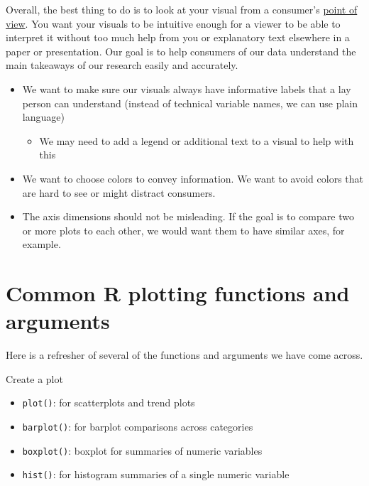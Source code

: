 \documentclass[
  letterpaper,
  DIV=11,
  numbers=noendperiod]{scrreprt}
\providecommand{\tightlist}{%
  \setlength{\itemsep}{0pt}\setlength{\parskip}{0pt}}\usepackage{longtable,booktabs,array}
\begin{document}
Overall, the best thing to do is to look at your visual from a
consumer's
\href{https://www.youtube.com/watch?v=nQJEp-k-ogs\&ab_channel=ArianaGrandeVevo}{point
of view}. You want your visuals to be intuitive enough for a viewer to
be able to interpret it without too much help from you or explanatory
text elsewhere in a paper or presentation. Our goal is to help consumers
of our data understand the main takeaways of our research easily and
accurately.

\begin{itemize}
\tightlist
\item
  We want to make sure our visuals always have informative labels that a
  lay person can understand (instead of technical variable names, we can
  use plain language)

  \begin{itemize}
  \tightlist
  \item
    We may need to add a legend or additional text to a visual to help
    with this
  \end{itemize}
\item
  We want to choose colors to convey information. We want to avoid
  colors that are hard to see or might distract consumers.
\item
  The axis dimensions should not be misleading. If the goal is to
  compare two or more plots to each other, we would want them to have
  similar axes, for example.
\end{itemize}

\hypertarget{common-r-plotting-functions-and-arguments}{%
\section{Common R plotting functions and
arguments}\label{common-r-plotting-functions-and-arguments}}

Here is a refresher of several of the functions and arguments we have
come across.

Create a plot

\begin{itemize}
\tightlist
\item
  \texttt{plot()}: for scatterplots and trend plots
\item
  \texttt{barplot()}: for barplot comparisons across categories
\item
  \texttt{boxplot()}: boxplot for summaries of numeric variables
\item
  \texttt{hist()}: for histogram summaries of a single numeric variable
\end{itemize}
\end{document}
